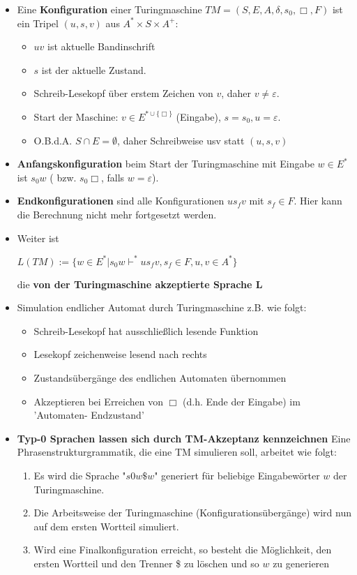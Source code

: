 \documentclass[12pt, a4paper]{article}
\begin{document}
\begin{itemize}
		\item Eine \textbf{Konfiguration} einer Turingmaschine $TM = (S, E, A, \delta, s_{0}, \Box, F)$ ist ein Tripel $(u, s, v)$ aus $A^{*}\times S\times A^{+}$:
		\begin{itemize}
			\item $uv$ ist aktuelle Bandinschrift
			\item $s$ ist der aktuelle Zustand.
			\item Schreib-Lesekopf über erstem Zeichen von $v$, daher $v\neq\varepsilon$.
			\item Start der Maschine: $v\in E^{*\cup\{\Box\}}$ (Eingabe), $s = s_{0} , u = \varepsilon$.
			\item O.B.d.A. $S \cap E = \emptyset$, daher Schreibweise usv statt $(u, s, v)$
		\end{itemize}
	
		\item \textbf{Anfangskonfiguration} beim Start der Turingmaschine mit Eingabe $w \in E^{*}$ ist
		$s_{0}w$ ( bzw. $s_{0}\Box$, falls $w = \varepsilon$).
		
		\item \textbf{Endkonfigurationen} sind alle Konfigurationen $us_{f}v$ mit $s_{f}\in F$. Hier kann die Berechnung nicht mehr fortgesetzt werden.
		
		\item Weiter ist
		\begin{center}
			$L(TM) := \{w \in E^{*}| s_{0}w\vdash^{*}us_{f}v, s_{f}\in F, u, v \in A^{*}\}$
		\end{center}
		die \textbf{von der Turingmaschine akzeptierte Sprache L}
		
		\item Simulation endlicher Automat durch Turingmaschine z.B. wie folgt:
		\begin{itemize}
			\item Schreib-Lesekopf hat ausschließlich lesende Funktion
			\item Lesekopf zeichenweise lesend nach rechts
			\item Zustandsübergänge des endlichen Automaten übernommen
			\item Akzeptieren bei Erreichen von $\Box$ (d.h. Ende der Eingabe) im 'Automaten-
			Endzustand'
		\end{itemize} 
		
		\item \textbf{Typ-0 Sprachen lassen sich durch TM-Akzeptanz kennzeichnen}
			\subitem Eine Phrasenstrukturgrammatik, die eine TM simulieren soll, arbeitet wie folgt:
			\begin{enumerate}
				\item Es wird die Sprache "$s 0 w\$w$" generiert für beliebige Eingabewörter $w$ der Turingmaschine.
				\item Die Arbeitsweise der Turingmaschine (Konfigurationsübergänge) wird nun
				auf dem ersten Wortteil simuliert.
				\item Wird eine Finalkonfiguration erreicht, so besteht die Möglichkeit, den ersten
				Wortteil und den Trenner \$ zu löschen und so $w$ zu generieren
			\end{enumerate}
		

\end{itemize}
\end{document}
